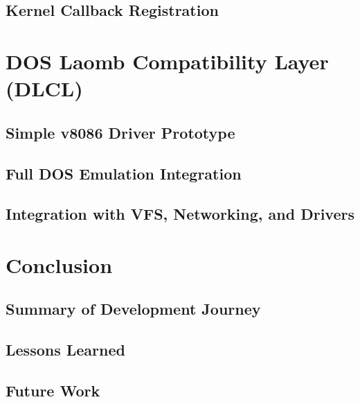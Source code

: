 \documentclass[12pt,a4paper]{report}
\begin{document}
	\section{Kernel Callback Registration}
	
	\chapter{DOS Laomb Compatibility Layer (DLCL)}
	\section{Simple v8086 Driver Prototype}

	\section{Full DOS Emulation Integration}
	
	\section{Integration with VFS, Networking, and Drivers}
	
	\chapter{Conclusion}
	\section{Summary of Development Journey}
	
	\section{Lessons Learned}

	\section{Future Work}
\end{document}
